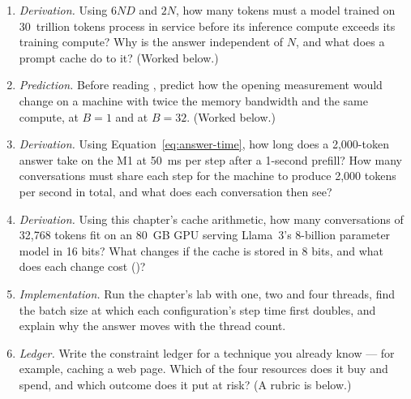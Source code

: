 \ExercisesSection

\begin{enumerate}
\item \emph{Derivation.} Using $6ND$ and $2N$, how many tokens must a model
trained on 30~trillion tokens process in service before its inference compute
exceeds its training compute? Why is the answer independent of $N$, and what
does a prompt cache do to it? (Worked below.)
\item \emph{Prediction.} Before reading , predict how the
opening measurement would change on a machine with twice the memory bandwidth
and the same compute, at $B = 1$ and at $B = 32$. (Worked below.)
\item \emph{Derivation.} Using Equation~\ref{eq:answer-time}, how long does a
2,000-token answer take on the M1 at 50~ms per step after a 1-second prefill?
How many conversations must share each step for the machine to produce 2,000
tokens per second in total, and what does each conversation then see?
\item \emph{Derivation.} Using this chapter's cache arithmetic, how many
conversations of 32,768 tokens fit on an 80~GB GPU serving Llama~3's 8-billion
parameter model in 16 bits? What changes if the cache is stored in 8 bits, and
what does each change cost ()?
\item \emph{Implementation.} Run the chapter's lab with one, two and four
threads, find the batch size at which each configuration's step time first
doubles, and explain why the answer moves with the thread count.
\item \emph{Ledger.} Write the constraint ledger for a technique you already
know --- for example, caching a web page. Which of the four resources does it
buy and spend, and which outcome does it put at risk? (A rubric is below.)
\end{enumerate}


